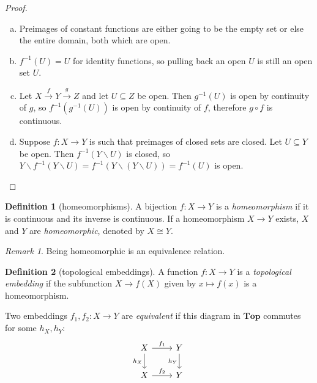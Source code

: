 \documentclass[11pt]{article}
\theoremstyle{definition}
\newtheorem{definition}{Definition}[section]
\theoremstyle{remark}
\newtheorem{remark}{Remark}[section]
\begin{document}
\begin{proof}
    \,
    \begin{enumerate}[(a)]
        \item
            Preimages of constant functions are either going to be the empty set or else the entire domain, both which are open.
        \item
            $f^{-1}(U) = U$ for identity functions, so pulling back an open $U$ is still an open set $U$.
        \item
            Let $X \xrightarrow{f} Y \xrightarrow{g} Z$ and let $U \subseteq Z$ be open. Then $g^{-1}(U)$ is open by continuity of $g$, so $f^{-1}(g^{-1}(U))$ is open by continuity of $f$, therefore $g \circ f$ is continuous.
        \item
            Suppose $f : X \to Y$ is such that preimages of closed sets are closed. Let $U \subseteq Y$ be open. Then $f^{-1}(Y \smallsetminus U)$ is closed, so $Y \smallsetminus f^{-1}(Y \smallsetminus U) = f^{-1}(Y \smallsetminus (Y \smallsetminus U)) = f^{-1}(U)$ is open.
    \end{enumerate}
\end{proof}

\begin{definition}[homeomorphisms]
    A bijection $f : X \to Y$ is a \emph{homeomorphism} if it is continuous and its inverse is continuous. If a homeomorphism $X \to Y$ exists, $X$ and $Y$ are \emph{homeomorphic}, denoted by $X \cong Y$.
\end{definition}

\begin{remark}
    Being homeomorphic is an equivalence relation.
\end{remark}

\begin{definition}[topological embeddings]
    A function $f : X \to Y$ is a \emph{topological embedding} if the subfunction $X \to f(X)$ given by $x \mapsto f(x)$ is a homeomorphism.

    Two embeddings $f_1, f_2 : X \to Y$ are \emph{equivalent} if this diagram in $\mathbf{Top}$ commutes for some $h_X, h_Y$:
    \[\begin{tikzcd}
        X & Y \\
        X & Y
        \arrow["{f_1}", from=1-1, to=1-2]
        \arrow["{h_X}"', from=1-1, to=2-1]
        \arrow["{h_Y}"', from=1-2, to=2-2]
        \arrow["{f_2}", from=2-1, to=2-2]
    \end{tikzcd}\]
\end{definition}
\end{document}
